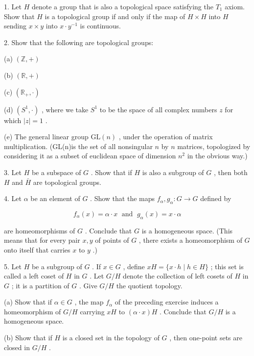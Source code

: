 1. Let \(H\) denote a group that is also a topological space satisfying the \({T}_{1}\) axiom. Show that \(H\) is a topological group if and only if the map of \(H \times  H\) into \(H\) sending \(x \times  y\) into \(x \cdot  {y}^{-1}\) is continuous.

2. Show that the following are topological groups:

(a) \(\left( {\mathbb{Z}, + }\right)\)

(b) \(\left( {\mathbb{R}, + }\right)\)

(c) \(\left( {{\mathbb{R}}_{ + }, \cdot  }\right)\)

(d) \(\left( {{S}^{1}, \cdot  }\right)\) , where we take \({S}^{1}\) to be the space of all complex numbers \(z\) for which \(\left| z\right|  = 1\) .

(e) The general linear group \(\mathrm{{GL}}\left( n\right)\) , under the operation of matrix multiplication. (GL(n)is the set of all nonsingular \(n\) by \(n\) matrices, topologized by considering it as a subset of euclidean space of dimension \({n}^{2}\) in the obvious way.)

3. Let \(H\) be a subspace of \(G\) . Show that if \(H\) is also a subgroup of \(G\) , then both \(H\) and \(\bar{H}\) are topological groups.

4. Let \(\alpha\) be an element of \(G\) . Show that the maps \({f}_{\alpha },{g}_{\alpha } : G \rightarrow  G\) defined by

\[
{f}_{\alpha }\left( x\right)  = \alpha  \cdot  x\;\text{ and }\;{g}_{\alpha }\left( x\right)  = x \cdot  \alpha
\]

are homeomorphisms of \(G\) . Conclude that \(G\) is a homogeneous space. (This means that for every pair \(x,y\) of points of \(G\) , there exists a homeomorphism of \(G\) onto itself that carries \(x\) to \(y\) .)

5. Let \(H\) be a subgroup of \(G\) . If \(x \in  G\) , define \({xH} = \{ x \cdot  h \mid  h \in  H\}\) ; this set is called a left coset of \(H\) in \(G\) . Let \(G/H\) denote the collection of left cosets of \(H\) in \(G\) ; it is a partition of \(G\) . Give \(G/H\) the quotient topology.

(a) Show that if \(\alpha  \in  G\) , the map \({f}_{\alpha }\) of the preceding exercise induces a homeomorphism of \(G/H\) carrying \({xH}\) to \(\left( {\alpha  \cdot  x}\right) H\) . Conclude that \(G/H\) is a homogeneous space.

(b) Show that if \(H\) is a closed set in the topology of \(G\) , then one-point sets are closed in \(G/H\) .

